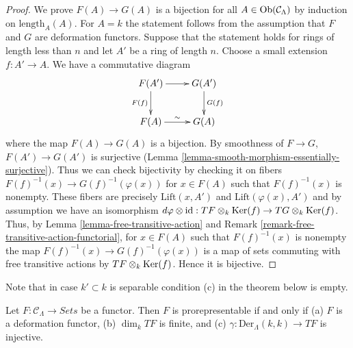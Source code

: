 \begin{proof}
We prove $F(A) \to G(A)$ is a bijection for all $A \in
\mathop{\mathrm{Ob}}\nolimits(\mathcal{C}_\Lambda)$ by induction on
$\text{length}_A(A)$.  For $A = k$ the statement follows from the
assumption that $F$ and $G$ are deformation functors. Suppose that the
statement holds for rings of length less than $n$ and let $A'$ be a ring of
length $n$. Choose a small extension $f : A' \to A$.  We have a
commutative diagram
$$
\xymatrix{
F(A') \ar[r] \ar[d]_{F(f)} & G(A') \ar[d]^{G(f)} \\
F(A) \ar[r]^{\sim} & G(A)
}
$$
where the map $F(A) \to G(A)$ is a bijection.  By smoothness of $F
\to G$, $F(A') \to G(A')$ is surjective (Lemma
\ref{lemma-smooth-morphism-essentially-surjective}).  Thus we can check
bijectivity by checking it on fibers $F(f)^{-1}(x) \to
G(f)^{-1}(\varphi(x))$ for $x \in F(A)$ such that $F(f)^{-1}(x)$ is nonempty.
These fibers are precisely $\text{Lift}(x, A')$ and
$\text{Lift}(\varphi(x), A')$ and by assumption we have an isomorphism
$d\varphi \otimes \text{id} :
TF \otimes_k \mathop{\mathrm{Ker}}(f)  \to TG \otimes_k \mathop{\mathrm{Ker}}(f)$.
Thus, by
Lemma \ref{lemma-free-transitive-action} and
Remark \ref{remark-free-transitive-action-functorial},
for $x \in F(A)$ such that $F(f)^{-1}(x)$ is nonempty the map
$F(f)^{-1}(x) \to G(f)^{-1}(\varphi(x))$ is a map of sets commuting
with free transitive actions by $TF \otimes_k \mathop{\mathrm{Ker}}(f)$.
Hence it is bijective.
\end{proof}

\noindent
Note that in case $k' \subset k$ is separable condition (c) in
the theorem below is empty.

\begin{theorem}
\label{theorem-Schlessinger-prorepresentability}
Let $F: \mathcal{C}_\Lambda \to \textit{Sets}$ be a functor.
Then $F$ is prorepresentable if and only if
(a) $F$ is a deformation functor,
(b) $\dim_k TF$ is finite, and (c) $\gamma : \text{Der}_\Lambda(k, k) \to TF$
is injective.
\end{theorem}


